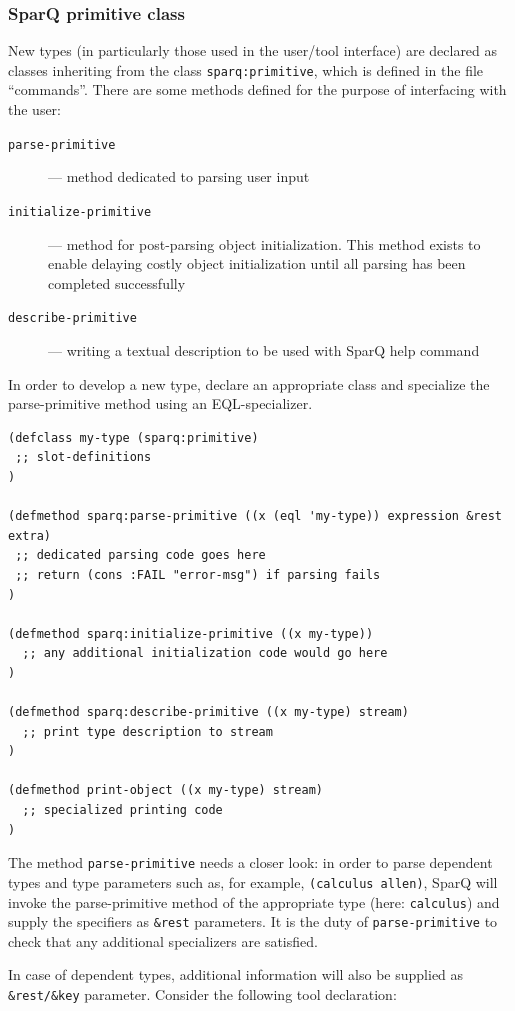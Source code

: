 \documentclass[headsepline]{scrreprt}
\theoremstyle{definition}
\newlength{\rest}
\newcommand{\engine}{SparQ}
\begin{document}
\subsubsection{\engine{} primitive class}
New types (in particularly those used in the user/tool interface) are declared as classes inheriting from the class {\tt sparq:primitive}, which is defined in the file ``commands''. There are some methods defined for the purpose of interfacing with the user:

\begin{description}
	\item[{\tt parse-primitive}]--- method dedicated to parsing user input
	\item[{\tt initialize-primitive}]--- method for post-parsing object initialization. This method exists to enable delaying costly object initialization until all parsing has been completed successfully
	\item[{\tt describe-primitive}]--- writing a textual description to be used with \engine{} help command
\end{description}

In order to develop a new type, declare an appropriate class and specialize the parse-primitive method using an EQL-specializer.
\begin{lstlisting}
(defclass my-type (sparq:primitive)
 ;; slot-definitions
)

(defmethod sparq:parse-primitive ((x (eql 'my-type)) expression &rest extra)
 ;; dedicated parsing code goes here
 ;; return (cons :FAIL "error-msg") if parsing fails
)

(defmethod sparq:initialize-primitive ((x my-type))
  ;; any additional initialization code would go here
)

(defmethod sparq:describe-primitive ((x my-type) stream)
  ;; print type description to stream
)

(defmethod print-object ((x my-type) stream)
  ;; specialized printing code
)
\end{lstlisting}

The method {\tt parse-primitive} needs a closer look: in order to parse dependent types and type parameters such as, for example, {\tt (calculus allen)}, \engine{} will invoke the parse-primitive method of the appropriate type (here: {\tt calculus}) and supply the specifiers as {\tt \&rest} parameters. 
It is the duty of {\tt parse-primitive} to check that any additional specializers are satisfied.

In case of dependent types, additional information will also be supplied as {\tt \&rest/\&key} parameter. 
Consider the following tool declaration:
\end{document}
